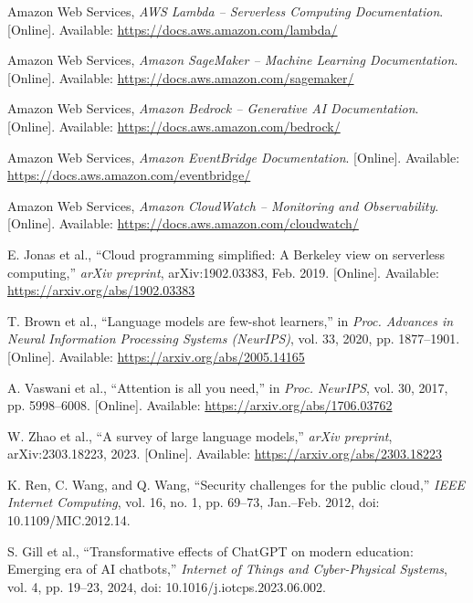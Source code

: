 \documentclass[12pt, a4paper, oneside]{report}
\begin{document}
\begin{enumerate}[leftmargin=1.5cm, label={[\arabic*]}]

    \item Amazon Web Services, \textit{AWS Lambda -- Serverless Computing Documentation}. [Online]. Available: \url{https://docs.aws.amazon.com/lambda/}

    \item Amazon Web Services, \textit{Amazon SageMaker -- Machine Learning Documentation}. [Online]. Available: \url{https://docs.aws.amazon.com/sagemaker/}

    \item Amazon Web Services, \textit{Amazon Bedrock -- Generative AI Documentation}. [Online]. Available: \url{https://docs.aws.amazon.com/bedrock/}

    \item Amazon Web Services, \textit{Amazon EventBridge Documentation}. [Online]. Available: \url{https://docs.aws.amazon.com/eventbridge/}

    \item Amazon Web Services, \textit{Amazon CloudWatch -- Monitoring and Observability}. [Online]. Available: \url{https://docs.aws.amazon.com/cloudwatch/}

    \item E. Jonas et al., ``Cloud programming simplified: A Berkeley view on serverless computing,'' \textit{arXiv preprint}, arXiv:1902.03383, Feb. 2019. [Online]. Available: \url{https://arxiv.org/abs/1902.03383}

    \item T. Brown et al., ``Language models are few-shot learners,'' in \textit{Proc. Advances in Neural Information Processing Systems (NeurIPS)}, vol. 33, 2020, pp. 1877--1901. [Online]. Available: \url{https://arxiv.org/abs/2005.14165}

    \item A. Vaswani et al., ``Attention is all you need,'' in \textit{Proc. NeurIPS}, vol. 30, 2017, pp. 5998--6008. [Online]. Available: \url{https://arxiv.org/abs/1706.03762}

    \item W. Zhao et al., ``A survey of large language models,'' \textit{arXiv preprint}, arXiv:2303.18223, 2023. [Online]. Available: \url{https://arxiv.org/abs/2303.18223}

    \item K. Ren, C. Wang, and Q. Wang, ``Security challenges for the public cloud,'' \textit{IEEE Internet Computing}, vol. 16, no. 1, pp. 69--73, Jan.--Feb. 2012, doi: 10.1109/MIC.2012.14.

    \item S. Gill et al., ``Transformative effects of ChatGPT on modern education: Emerging era of AI chatbots,'' \textit{Internet of Things and Cyber-Physical Systems}, vol. 4, pp. 19--23, 2024, doi: 10.1016/j.iotcps.2023.06.002.

\end{enumerate}
\end{document}
